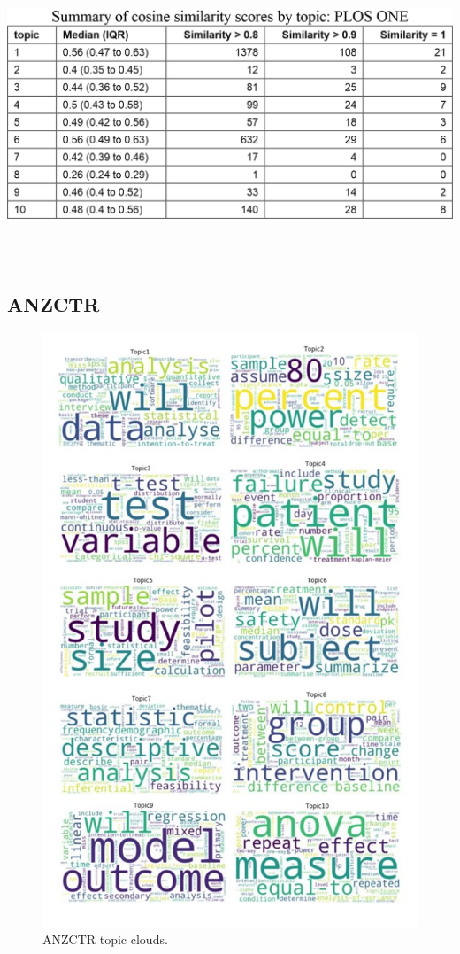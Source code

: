 \documentclass[12pt]{article}
\begin{document}
\includegraphics[width=6.13in,height=3.49in,keepaspectratio]{asa_template_files/figure-latex/unnamed-chunk-7-1.png}

\subsection{ANZCTR}

\begin{figure}

{\centering \includegraphics[width=0.7\linewidth]{figures/anzctr.wordclouds} 

}

\caption{ANZCTR topic clouds.}\label{fig:unnamed-chunk-8}
\end{figure}
\end{document}
